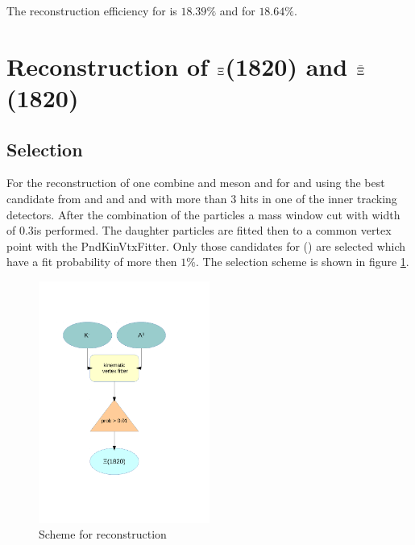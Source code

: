 		The reconstruction efficiency for \anticascade is $18.39\%$ and for \cascade $18.64\%$.
		
	
	
	

\section{Reconstruction of $\boldmath{\Xi}$(1820) and $\boldmath{\bar{\Xi}}$(1820)}
		\subsection*{Selection}

		For the reconstruction of \excitedcascade one combine \lam and \kminus meson and for \excitedanticascade \alam and \kplus using the
		best candidate from \lam and \alam and \kplus and \kminus with more than 3 hits in one of the inner tracking detectors.
		After the combination of the particles a mass window cut with width of $0.3$\massunit is performed. 
		The daughter particles are fitted then to a common vertex point with the PndKinVtxFitter.
		Only those candidates for \excitedcascade (\excitedanticascade) are selected which have a fit probability of more then $1\%$.
		The selection scheme is shown in figure \ref{fig:excitedcascade_scheme}. 
		
		\begin{figure}
			\centering
				\includegraphics[width=0.50\textwidth]{./plots/combineExcitedCascade.pdf}
			\caption{Scheme for \excitedcascade reconstruction}
			\label{fig:excitedcascade_scheme}
		\end{figure}
		
